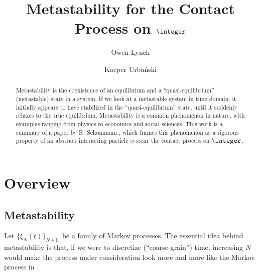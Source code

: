 \documentclass{scrartcl}
\title{Metastability for the Contact Process on $\integer$}
\author{Owen Lynch \and Kacper Urbański}
\begin{document}
\maketitle
\begin{abstract}
    Metastability is the coexistence of an equilibrium and a ``quasi-equilibrium'' (metastable) state in a system. If we look at a metastable system in time domain, it 
    initially appears to have stabilized in the ``quasi-equilibrium'' state,
    until it suddenly relaxes to the true equilibrium. Metastability is a common phenomenon in nature, with examples ranging from physics to economics and social sciences. 
    This work is a summary of a paper by R. Schonmann \cite{schonmann}, which
    frames this phenomenon as a rigorous property of an abstract interacting particle system--the contact process on $\integer$.
\end{abstract}

\section{Overview} \label{overview}

\subsection{Metastability}

Let $\{ \xi_N(t) \}_{N\in\mathbb{N}}$ be a family of Markov processes. The essential idea behind metastability is that, if we were to discretize (``coarse-grain'') time, increasing $N$ would make the process under consideration look more and more like the Markov process in .
\end{document}
